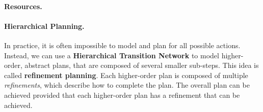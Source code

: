 \documentclass[10pt,a4paper]{article}
\begin{document}
\paragraph{Resources.}

\paragraph{Hierarchical Planning.} In practice, it is often impossible to model and plan for all possible actions. Instead, we can use a \textbf{Hierarchical Transition Network} to model higher-order, abstract plans, that are composed of several smaller sub-steps. This idea is called \textbf{refinement planning}. Each higher-order plan is composed of multiple \textit{refinements}, which describe how to complete the plan. The overall plan can be achieved provided that each higher-order plan has a refinement that can be achieved.
\end{document}

